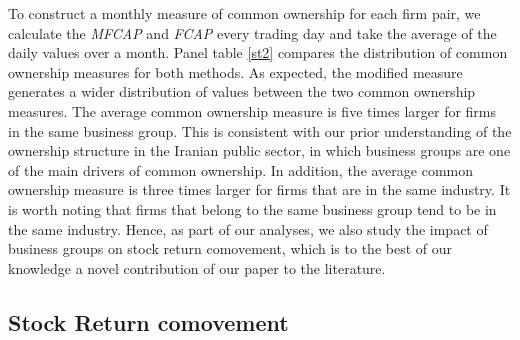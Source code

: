
To construct a monthly measure of common ownership for each firm pair, we calculate the \textit{MFCAP} and \textit{FCAP} every trading day and take the average of the daily values over a month. Panel  table \ref{st2} compares the distribution of common ownership measures for both methods. As expected, the modified measure generates a wider distribution of values between the two common ownership measures. The average common ownership measure is five times larger for firms in the same business group. This is consistent with our prior understanding of the ownership structure in the Iranian public sector, in which business groups are one of the main drivers of common ownership. In addition, the average common ownership measure is three times larger for firms that are in the same industry. It is worth noting that firms that belong to the same business group tend to be in the same industry.  Hence, as part of our analyses, we also study the impact of business groups on stock return comovement, which is to the best of our knowledge a novel contribution of our paper to the literature.

	
\FloatBarrier
\subsection{{Stock Return comovement}}
\label{comovement}

